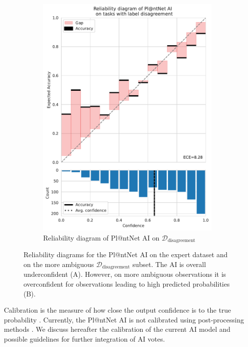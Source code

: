 \begin{figure}[tbh]
\begin{subfigure}[t]{.48\textwidth}
    \includegraphics[width=\textwidth]{./images_plantnet/reliability_diagram_disagreement.pdf}
    \caption{Reliability diagram of Pl@ntNet AI on $\mathcal{D}_{\mathrm{disagreement}}$ }
    \label{fig:reliability-disagreement}    \end{subfigure}
    \caption{Reliability diagrams for the Pl@ntNet AI on the expert dataset and on the more ambiguous $\mathcal{D}_\mathrm{disagreement}$ subset. The AI is overall underconfident (A). However, on more ambiguous observations it is overconfident for observations leading to high predicted probabilities (B).}
    \label{fig:reliability}
\end{figure}

Calibration is the measure of how close the output confidence is to the true probability \citep{niculescu2005predicting}. Currently, the Pl@ntNet AI is not calibrated using post-processing methods \citep{platt1999probabilistic, guo_calibration_2017}.
We discuss hereafter the calibration of the current AI model and possible guidelines for further integration of AI votes.

